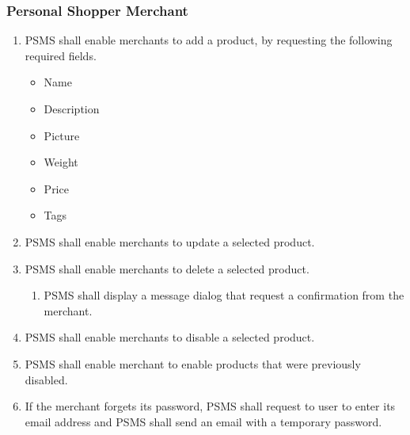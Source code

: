 \subsubsection{Personal Shopper Merchant}
\begin{enumerate}[resume, label=SY-\arabic*]
    \item PSMS shall enable merchants to add a product, by requesting the 
    following required fields.
    \begin{itemize}
        \item Name
        \item Description
        \item Picture
        \item Weight
        \item Price 
        \item Tags
    \end{itemize}
    \item PSMS shall enable merchants to update a selected product.
    \item PSMS shall enable merchants to delete a selected product.
    \begin{enumerate}[label=SY-24.\arabic*]
        \item PSMS shall display a message dialog that request a confirmation 
        from the merchant.
    \end{enumerate}
    \item PSMS shall enable merchants to disable a selected product.
    \item PSMS shall enable merchant to enable products that were 
    previously disabled.
    \item If the merchant forgets its password, PSMS shall request to user 
    to enter its email address and PSMS shall send an email with a 
    temporary password.
\end{enumerate}

\pagebreak

